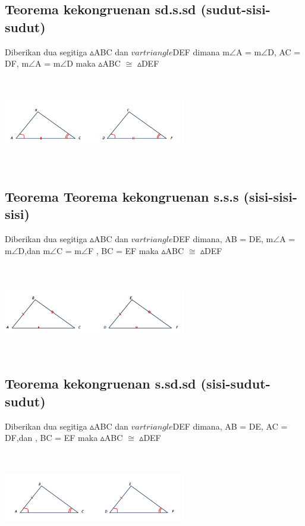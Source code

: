 \documentclass[11pt,fleqn]{book} %
\begin{document}
\subsection{Teorema kekongruenan sd.s.sd (sudut-sisi-sudut)}
\begin{theorem}
Diberikan dua segitiga $\vartriangle $ABC dan $vartriangle $DEF dimana m$\angle$A = m$\angle$D, AC = DF, m$\angle$A = m$\angle$D maka $\vartriangle $ABC $\cong$ $\vartriangle $DEF
\end{theorem}
\includegraphics[width = 8cm, height= 4cm]{Pictures/5.png}


\subsection{Teorema Teorema kekongruenan s.s.s (sisi-sisi-sisi)}
\begin{theorem}
Diberikan dua segitiga $\vartriangle $ABC dan $vartriangle $DEF dimana, AB = DE,  m$\angle$A = m$\angle$D,dan  m$\angle$C = m$\angle$F , BC = EF  maka $\vartriangle $ABC $\cong$ $\vartriangle $DEF
\end{theorem}
\includegraphics[width = 8cm, height= 4cm]{Pictures/6.png}

\subsection{Teorema kekongruenan s.sd.sd (sisi-sudut-sudut)}
\begin{theorem}
Diberikan dua segitiga $\vartriangle $ABC dan $vartriangle $DEF dimana, AB = DE, AC = DF,dan , BC = EF  maka $\vartriangle $ABC $\cong$ $\vartriangle $DEF
\end{theorem}
\includegraphics[width = 8cm, height= 4cm]{Pictures/7.png}
\end{document}
